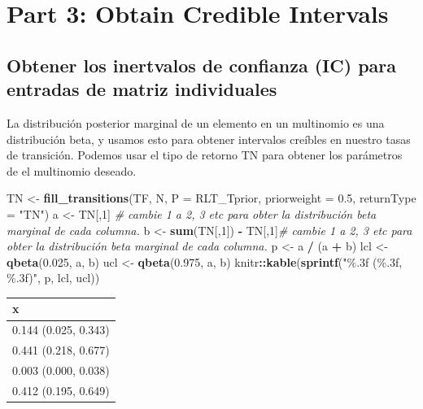 \documentclass[
]{book}
\newenvironment{Shaded}{\begin{snugshade}}{\end{snugshade}}
\newcommand{\AttributeTok}[1]{\textcolor[rgb]{0.13,0.29,0.53}{#1}}
\newcommand{\CommentTok}[1]{\textcolor[rgb]{0.56,0.35,0.01}{\textit{#1}}}
\newcommand{\DecValTok}[1]{\textcolor[rgb]{0.00,0.00,0.81}{#1}}
\newcommand{\FloatTok}[1]{\textcolor[rgb]{0.00,0.00,0.81}{#1}}
\newcommand{\FunctionTok}[1]{\textcolor[rgb]{0.13,0.29,0.53}{\textbf{#1}}}
\newcommand{\NormalTok}[1]{#1}
\newcommand{\OtherTok}[1]{\textcolor[rgb]{0.56,0.35,0.01}{#1}}
\newcommand{\SpecialCharTok}[1]{\textcolor[rgb]{0.81,0.36,0.00}{\textbf{#1}}}
\newcommand{\StringTok}[1]{\textcolor[rgb]{0.31,0.60,0.02}{#1}}
\theoremstyle{definition}
\theoremstyle{definition}
\theoremstyle{definition}
\theoremstyle{definition}
\theoremstyle{remark}
\begin{document}
\section{Part 3: Obtain Credible Intervals}\label{part-3-obtain-credible-intervals}

\subsection{Obtener los inertvalos de confianza (IC) para entradas de matriz individuales}\label{obtener-los-inertvalos-de-confianza-ic-para-entradas-de-matriz-individuales}

La distribución posterior marginal de un elemento en un multinomio es una
distribución beta, y usamos esto para obtener intervalos creíbles en nuestro
tasas de transición. Podemos usar el tipo de retorno TN para obtener los parámetros de el multinomio deseado.

\begin{Shaded}
\begin{Highlighting}[]
\NormalTok{TN }\OtherTok{\textless{}{-}} \FunctionTok{fill\_transitions}\NormalTok{(TF, N, }\AttributeTok{P =}\NormalTok{ RLT\_Tprior, }\AttributeTok{priorweight =} \FloatTok{0.5}\NormalTok{, }\AttributeTok{returnType =} \StringTok{"TN"}\NormalTok{)}
\NormalTok{a }\OtherTok{\textless{}{-}}\NormalTok{ TN[,}\DecValTok{1}\NormalTok{] }\CommentTok{\# cambie 1 a 2, 3 etc para obter la distribución beta marginal de cada columna. }
\NormalTok{b }\OtherTok{\textless{}{-}} \FunctionTok{sum}\NormalTok{(TN[,}\DecValTok{1}\NormalTok{]) }\SpecialCharTok{{-}}\NormalTok{ TN[,}\DecValTok{1}\NormalTok{]}\CommentTok{\# cambie 1 a 2, 3 etc para obter la distribución beta marginal de cada columna. }
\NormalTok{p }\OtherTok{\textless{}{-}}\NormalTok{ a }\SpecialCharTok{/}\NormalTok{ (a }\SpecialCharTok{+}\NormalTok{ b)}
\NormalTok{lcl }\OtherTok{\textless{}{-}} \FunctionTok{qbeta}\NormalTok{(}\FloatTok{0.025}\NormalTok{, a, b)}
\NormalTok{ucl }\OtherTok{\textless{}{-}} \FunctionTok{qbeta}\NormalTok{(}\FloatTok{0.975}\NormalTok{, a, b)}
\NormalTok{knitr}\SpecialCharTok{::}\FunctionTok{kable}\NormalTok{(}\FunctionTok{sprintf}\NormalTok{(}\StringTok{"\%.3f (\%.3f, \%.3f)"}\NormalTok{, p, lcl, ucl))}
\end{Highlighting}
\end{Shaded}

\begin{tabular}{l}
\hline
x\\
\hline
0.144 (0.025, 0.343)\\
\hline
0.441 (0.218, 0.677)\\
\hline
0.003 (0.000, 0.038)\\
\hline
0.412 (0.195, 0.649)\\
\hline
\end{tabular}
\end{document}
